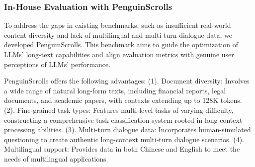 \documentclass{article}
\begin{document}
\subsubsection{In-House Evaluation with PenguinScrolls}
To address the gaps in existing benchmarks, such as insufficient real-world content diversity and lack of multilingual and multi-turn dialogue data, we developed PenguinScrolls. 
This benchmark aims to guide the optimization of LLMs' long-text capabilities and align evaluation metrics with genuine user perceptions of LLMs' performance.

PenguinScrolls offers the following advantages: (1). Document diversity: Involves a wide range of natural long-form texts, including financial reports, legal documents, and academic papers, with contexts extending up to 128K tokens. (2). Fine-grained task types: Features multi-level tasks of varying difficulty, constructing a comprehensive task classification system rooted in long-context processing abilities. (3). Multi-turn dialogue data: Incorporates human-simulated questioning to create authentic long-context multi-turn dialogue scenarios. (4). Multilingual support: Provides data in both Chinese and English to meet the needs of multilingual applications.
\end{document}
